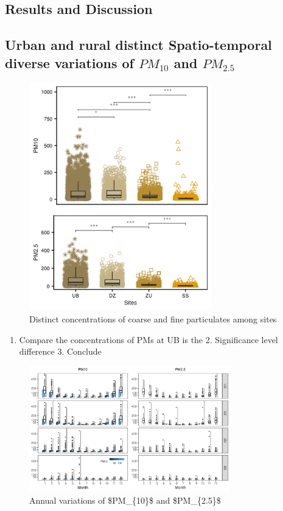 \documentclass[
  11pt,
]{article}
\providecommand{\tightlist}{%
  \setlength{\itemsep}{0pt}\setlength{\parskip}{0pt}}
\begin{document}
\newpage

\subsection{Results and Discussion}\label{results-and-discussion}

\newpage
\subsection{Urban and rural distinct Spatio-temporal diverse variations of $PM_{10}$ and $PM_{2.5}$}

\begin{figure}
\centering
\includegraphics[width=3.125in,height=\textheight]{images/figure_3.png}
\caption{Distinct concentrations of coarse and fine particulates among
sites}
\end{figure}

\begin{enumerate}
\def\labelenumi{\arabic{enumi}.}
\tightlist
\item
  Compare the concentrations of PMs at UB is the 2. Significance level
  difference 3. Conclude
\end{enumerate}

\newpage

\begin{figure}
\centering
\includegraphics[width=3.4375in,height=\textheight]{images/figure_4.png}
\caption{Annual variations of \$PM\_\{10\}\$ and \$PM\_\{2.5\}\$}
\end{figure}
\end{document}
